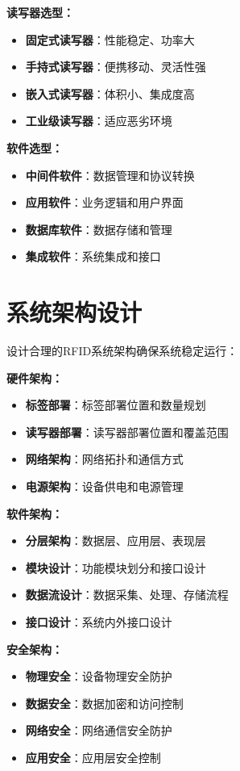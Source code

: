 \documentclass[12pt,UTF8]{ctexbook}
\begin{document}
\begin{itemize}[leftmargin=3.5em]
\begin{itemize}[leftmargin=3.5em]
\begin{itemize}[leftmargin=3.5em]
\begin{itemize}[leftmargin=3.5em]
\textbf{读写器选型：}
\begin{itemize}[leftmargin=3.5em]
    \item \textbf{固定式读写器}：性能稳定、功率大
    \item \textbf{手持式读写器}：便携移动、灵活性强
    \item \textbf{嵌入式读写器}：体积小、集成度高
    \item \textbf{工业级读写器}：适应恶劣环境
\end{itemize}

\textbf{软件选型：}
\begin{itemize}[leftmargin=3.5em]
    \item \textbf{中间件软件}：数据管理和协议转换
    \item \textbf{应用软件}：业务逻辑和用户界面
    \item \textbf{数据库软件}：数据存储和管理
    \item \textbf{集成软件}：系统集成和接口
\end{itemize}

\section{系统架构设计}

设计合理的RFID系统架构确保系统稳定运行：

\textbf{硬件架构：}
\begin{itemize}[leftmargin=3.5em]
    \item \textbf{标签部署}：标签部署位置和数量规划
    \item \textbf{读写器部署}：读写器部署位置和覆盖范围
    \item \textbf{网络架构}：网络拓扑和通信方式
    \item \textbf{电源架构}：设备供电和电源管理
\end{itemize}

\textbf{软件架构：}
\begin{itemize}[leftmargin=3.5em]
    \item \textbf{分层架构}：数据层、应用层、表现层
    \item \textbf{模块设计}：功能模块划分和接口设计
    \item \textbf{数据流设计}：数据采集、处理、存储流程
    \item \textbf{接口设计}：系统内外接口设计
\end{itemize}

\textbf{安全架构：}
\begin{itemize}[leftmargin=3.5em]
    \item \textbf{物理安全}：设备物理安全防护
    \item \textbf{数据安全}：数据加密和访问控制
    \item \textbf{网络安全}：网络通信安全防护
    \item \textbf{应用安全}：应用层安全控制
\end{itemize}


\end{itemize}
\end{itemize}
\end{itemize}
\end{itemize}
\end{document}
